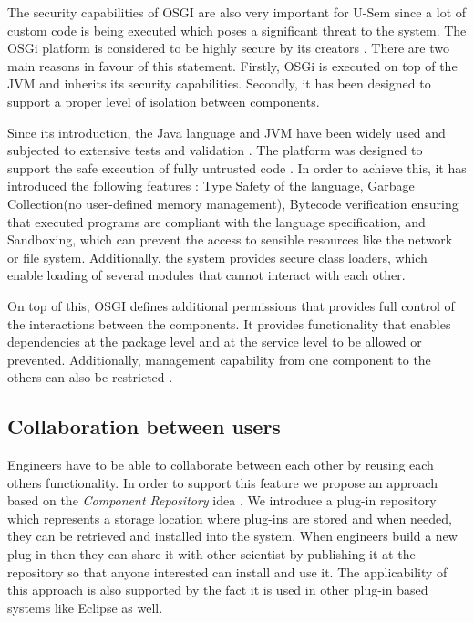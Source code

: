 The security capabilities of OSGI are also very important for U-Sem since a lot of custom code is being executed which poses a significant threat to the system. The OSGi platform is considered to be highly secure by its creators \cite{parrend2009security}. There are two main reasons in favour of this statement. Firstly, OSGi is executed on top of the JVM and inherits its security capabilities. Secondly, it has been designed to support a proper level of isolation between components.

Since its introduction, the Java language and JVM have been widely used and subjected to extensive tests and validation \cite{parrend2009security}. The platform was designed to support the safe execution of fully untrusted code \cite{dean1996java}. In order to achieve this, it has introduced the following features \cite{gong2003inside}: Type Safety of the language, Garbage Collection(no user-defined memory management), Bytecode verification ensuring that executed programs are compliant with the language specification, and Sandboxing, which can prevent the access to sensible resources like the network or file system. Additionally, the system provides secure class loaders, which enable loading of several modules that cannot interact with each other.

On top of this, OSGI defines additional permissions that provides full control of the interactions between the components. It provides functionality that enables dependencies at the package level and at the service level to be allowed or prevented. Additionally, management capability from one component to the others can also be restricted \cite{parrend2009security}.

\subsection{Collaboration between users}

Engineers have to be able to collaborate between each other by reusing each others functionality. In order to support this feature we propose an approach based on the \textit{Component Repository} idea \cite{seacord1999software}. We introduce a plug-in repository which represents a storage location where plug-ins are stored and when needed, they can be retrieved and installed into the system. When engineers build a new plug-in then they can share it with other scientist by publishing it at the repository so that anyone interested can install and use it. The applicability of this approach is also supported by the fact it is used in other plug-in based systems like Eclipse \cite{mcaffer2010eclipse} as well.

